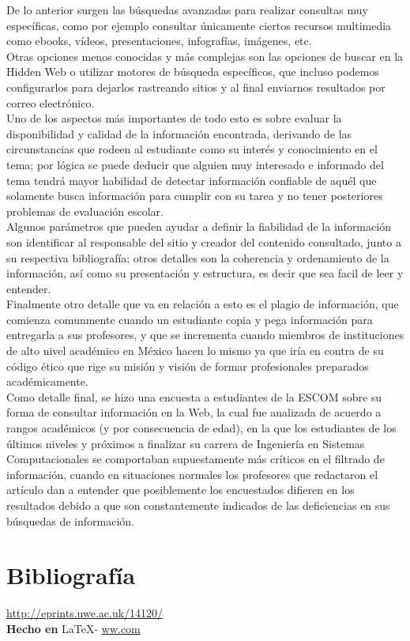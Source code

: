 \documentclass{article}
\begin{document}
{De lo anterior surgen las búsquedas avanzadas para realizar consultas muy específicas, como por ejemplo consultar únicamente ciertos recursos multimedia como ebooks, vídeos, presentaciones, infografías, imágenes, etc.
\\

Otras opciones menos conocidas y más complejas son las opciones de buscar en la Hidden Web o utilizar motores de búsqueda específicos, que incluso podemos configurarlos para dejarlos rastreando sitios y al final enviarnos resultados por correo electrónico.
\\

Uno de los aspectos más importantes de todo esto es sobre evaluar la disponibilidad y calidad de la información encontrada, derivando de las circunstancias que rodeen al estudiante como su interés y conocimiento en el tema; por lógica se puede deducir que alguien muy interesado e informado del tema tendrá mayor habilidad de detectar información confiable de aquél que solamente busca información para cumplir con su tarea y no tener posteriores problemas de evaluación escolar.
\\

Algunos parámetros que pueden ayudar a definir la fiabilidad de la información son identificar al responsable del sitio y creador del contenido consultado, junto a su respectiva bibliografía; otros detalles son la coherencia y ordenamiento de la información, así como su presentación y estructura, es decir que sea facil de leer y entender.
\\

Finalmente otro detalle que va en relación a esto es el plagio de información, que comienza comunmente cuando un estudiante copia y pega información para entregarla a sus profesores, y que se incrementa cuando miembros de instituciones de alto nivel académico en México hacen lo mismo ya que iría en contra de su código ético que rige su misión y visión de formar profesionales preparados académicamente.
\\

Como detalle final, se hizo una encuesta a estudiantes de la ESCOM sobre su forma de consultar información en la Web, la cual fue analizada de acuerdo a rangos académicos (y por consecuencia de edad), en la que los estudiantes de los últimos niveles y próximos a finalizar su carrera de Ingeniería en Sistemas Computacionales se comportaban supuestamente más críticos en el filtrado de información, cuando en situaciones normales los profesores que redactaron el artículo dan a entender que posiblemente los encuestados difieren en los resultados debido a que son constantemente indicados de las deficiencias en sus búsquedas de información.
}

\vspace{1cm}

\section*{Bibliograf\'ia}

\noindent \url{http://eprints.uwe.ac.uk/14120/}
\\

\large{\hfill \textbf{Hecho en } \LaTeX - \url{ww.com}}
\end{document}
